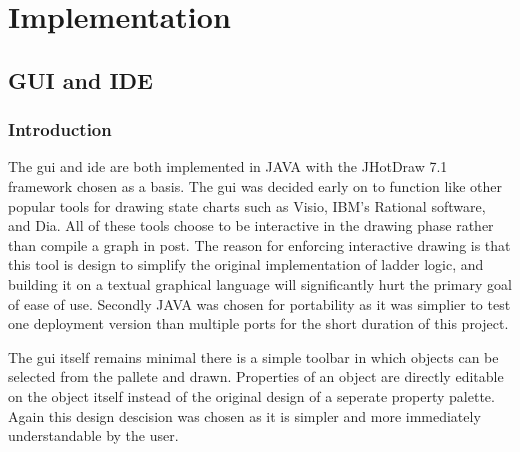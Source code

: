 \section{Implementation}
\subsection{GUI and IDE}
\subsubsection{Introduction}

The gui and ide are both implemented in JAVA with the JHotDraw 7.1 framework chosen as a basis. The gui was decided early on to function like other popular tools for drawing state charts such as Visio, IBM's Rational software, and Dia. All of these tools choose to be interactive in the drawing phase rather than compile a graph in post. The reason for enforcing interactive drawing is that this tool is design to simplify the original implementation of ladder logic, and building it on a textual graphical language will significantly hurt the primary goal of ease of use. Secondly JAVA was chosen for portability as it was simplier to test one deployment version than multiple ports for the short duration of this project.

The gui itself remains minimal %
there is a simple toolbar in which objects can be selected from the pallete and drawn. Properties of an object are directly editable on the object itself %
instead of the original design of a seperate property palette. Again this design descision was chosen as it is simpler and more immediately understandable by the user.


